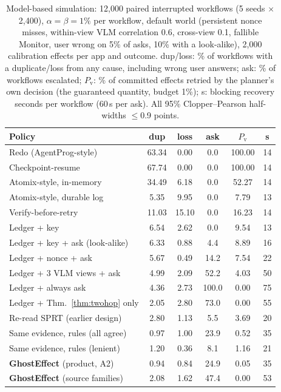 \begin{table}[t]
\centering
\caption{Model-based simulation: 12{,}000 paired interrupted workflows (5 seeds $\times$ 2{,}400), $\alpha{=}\beta{=}1\%$ per workflow, default
world (persistent nonce misses, within-view VLM correlation 0.6, cross-view 0.1, fallible Monitor, user wrong on 5\% of asks, 10\% with a look-alike), 2{,}000
calibration effects per app and outcome. dup/loss: \% of workflows with a duplicate/loss from any cause, including wrong user answers; ask: \% of workflows escalated;
$P_{\mathrm{v}}$: \% of committed effects retried by the planner's own decision (the guaranteed quantity, budget 1\%); s: blocking recovery
seconds per workflow (60\,s per ask). All 95\% Clopper--Pearson half-widths $\le$0.9 points.}
\label{tab:planner}
\footnotesize
\setlength{\tabcolsep}{2.2pt}
\begin{tabular}{@{}l ccccc@{}}
\toprule
Policy & dup & loss & ask & $P_{\mathrm{v}}$ & s \\
\midrule
Redo (AgentProg-style) & 63.34 & 0.00 & 0.0 & 100.00 & 14 \\
Checkpoint-resume & 67.74 & 0.00 & 0.0 & 100.00 & 14 \\
Atomix-style, in-memory & 34.49 & 6.18 & 0.0 & 52.27 & 14 \\
Atomix-style, durable log & 5.35 & 9.95 & 0.0 & 7.79 & 13 \\
Verify-before-retry & 11.03 & 15.10 & 0.0 & 16.23 & 14 \\
Ledger + key & 6.54 & 2.62 & 0.0 & 9.54 & 13 \\
Ledger + key + ask (look-alike) & 6.33 & 0.88 & 4.4 & 8.89 & 16 \\
Ledger + nonce + ask & 5.67 & 0.49 & 14.2 & 7.54 & 22 \\
Ledger + 3 VLM views + ask & 4.99 & 2.09 & 52.2 & 4.03 & 50 \\
Ledger + always ask & 4.36 & 2.73 & 100.0 & 0.00 & 75 \\
Ledger + Thm.~\ref{thm:twohop} only & 2.05 & 2.80 & 73.0 & 0.00 & 55 \\
Re-read SPRT (earlier design) & 2.80 & 1.13 & 5.5 & 3.69 & 20 \\
\midrule
Same evidence, rules (all agree) & 0.97 & 1.00 & 23.9 & 0.52 & 35 \\
Same evidence, rules (lenient) & 1.20 & 0.36 & 8.1 & 1.16 & 21 \\
\textbf{GhostEffect} (product, A2) & 0.94 & 0.84 & 24.9 & 0.05 & 35 \\
\textbf{GhostEffect} (source families) & 2.08 & 1.62 & 47.4 & 0.00 & 53 \\

\end{tabular}
\end{table}
